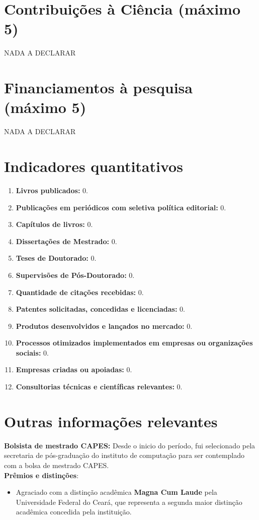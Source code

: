 \documentclass[11pt]{article}
\begin{document}
\section{Contribuições à Ciência (máximo 5)}

NADA A DECLARAR

\section{Financiamentos à pesquisa (máximo 5)}

NADA A DECLARAR


\section{Indicadores quantitativos}

\begin{enumerate}
  \item \textbf{Livros publicados:} 0.
  \item \textbf{Publicações em periódicos com seletiva política editorial:} 0.
  \item \textbf{Capítulos de livros:} 0.
  \item \textbf{Dissertações de Mestrado:} 0.
  \item \textbf{Teses de Doutorado:} 0.
  \item \textbf{Supervisões de Pós-Doutorado:} 0.
  \item \textbf{Quantidade de citações recebidas:} 0.
  \item \textbf{Patentes solicitadas, concedidas e licenciadas:} 0.
  \item \textbf{Produtos desenvolvidos e lançados no mercado:} 0.
  \item \textbf{Processos otimizados implementados em empresas ou organizações sociais:} 0.
  \item \textbf{Empresas criadas ou apoiadas:} 0.
  \item \textbf{Consultorias técnicas e científicas relevantes:} 0.
\end{enumerate}



\section{Outras informações relevantes}

\textbf{Bolsista de mestrado CAPES:}
Desde o inicio do período, fui selecionado pela secretaria de pós-graduação do instituto de computação para ser contemplado com a bolsa de mestrado CAPES. \\


\textbf{Prêmios e distinções}: 

\begin{itemize}
	\item Agraciado com a distinção acadêmica \textbf{Magna Cum Laude} pela Universidade Federal do Ceará, que representa a segunda maior distinção acadêmica concedida pela instituição.

	
\end{itemize}
\end{document}
